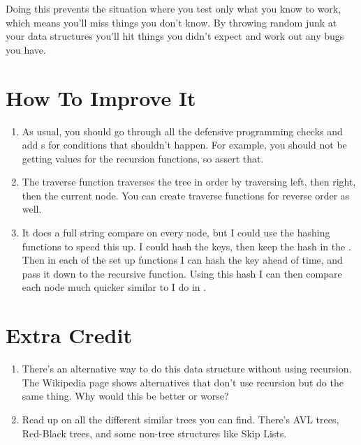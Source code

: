 Doing this prevents the situation where you test only what you know to work,
which means you'll miss things you don't know.  By throwing random junk at
your data structures you'll hit things you didn't expect and work out any
bugs you have.


\section{How To Improve It}

\begin{enumerate}
\item As usual, you should go through all the defensive programming checks and add
    s for conditions that shouldn't happen.  For example, you should
    not be getting  values for the recursion functions, so assert that.
\item The traverse function traverses the tree in order by traversing left, then right,
    then the current node.  You can create traverse functions for reverse order as well.
\item It does a full string compare on every node, but I could use the 
    hashing functions to speed this up.  I could hash the keys, then keep the hash in
    the .  Then in each of the set up functions I can hash the 
    key ahead of time, and pass it down to the recursive function.  Using this hash I can
    then compare each node much quicker similar to I do in .
\end{enumerate}

\section{Extra Credit}

\begin{enumerate}
\item There's an alternative way to do this data structure without using recursion.  The Wikipedia
    page shows alternatives that don't use recursion but do the same thing.  Why would this 
    be better or worse?
\item Read up on all the different similar trees you can find. There's AVL trees, Red-Black trees,
    and some non-tree structures like Skip Lists.
\end{enumerate}


